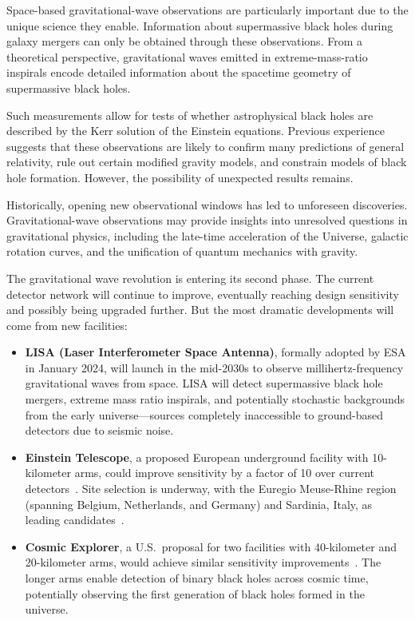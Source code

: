 Space-based gravitational-wave observations are particularly important due to the unique science they enable.
Information about supermassive black holes during galaxy mergers can only be obtained through these observations.
From a theoretical perspective, gravitational waves emitted in extreme-mass-ratio inspirals encode detailed information about the spacetime geometry of supermassive black holes.


Such measurements allow for tests of whether astrophysical black holes are described by the Kerr solution of the Einstein equations.
Previous experience suggests that these observations are likely to confirm many predictions of general relativity, rule out certain modified gravity models, and constrain models of black hole formation.
However, the possibility of unexpected results remains.


Historically, opening new observational windows has led to unforeseen discoveries.
Gravitational-wave observations may provide insights into unresolved questions in gravitational physics, including the late-time acceleration of the Universe, galactic rotation curves, and the unification of quantum mechanics with gravity.


The gravitational wave revolution is entering its second phase.
The current detector network will continue to improve, eventually reaching design sensitivity and possibly being upgraded further.
But the most dramatic developments will come from new facilities:
\begin{itemize}
    \item \textbf{LISA (Laser Interferometer Space Antenna)}, formally adopted by ESA in January 2024, will launch in the mid-2030s to observe millihertz-frequency gravitational waves from space.
    LISA will detect supermassive black hole mergers, extreme mass ratio inspirals, and potentially stochastic backgrounds from the early universe—sources completely inaccessible to ground-based detectors due to seismic noise.


    \item \textbf{Einstein Telescope}, a proposed European underground facility with 10-kilometer arms, could improve sensitivity by a factor of 10 over current detectors~\cite{etscienceteam_einstein_2011}.
    Site selection is underway, with the Euregio Meuse-Rhine region (spanning Belgium, Netherlands, and Germany) and Sardinia, Italy, as leading candidates~\cite{gupta_characterizing_2024}.

    \item \textbf{Cosmic Explorer}, a U.S.\ proposal for two facilities with 40-kilometer and 20-kilometer arms, would achieve similar sensitivity improvements~\cite{hall_cosmic_2022}.
    The longer arms enable detection of binary black holes across cosmic time, potentially observing the first generation of black holes formed in the universe.

\end{itemize}


